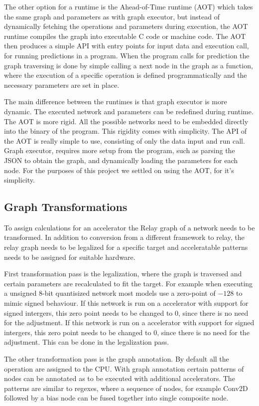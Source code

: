 \documentclass[12pt,a4paper,english
]{tunithesis}
\begin{document}
The other option for a runtime is the Ahead-of-Time runtime (AOT) which takes the same graph and parameters as with graph executor, but instead of dynamically fetching the operations and parameters during execution, the AOT runtime compiles the graph into executable C code or machine code. The AOT then produces a simple API with entry points for input data and execution call, for running predictions in a program. When the program calls for prediction the graph traversing is done by simple calling a next node in the graph as a function, where the execution of a specific operation is defined programmatically and the necessary parameters are set in place.

The main difference between the runtimes is that graph executor is more dynamic. The executed network and parameters can be redefined during runtime. The AOT is more rigid. All the possible networks need to be embedded directly into the binary of the program. This rigidity comes with simplicity. The API of the AOT is really simple to use, consisting of only the data input and run call. Graph executor, requires more setup from the program, such as parsing the JSON to obtain the graph, and dynamically loading the parameters for each node. For the purposes of this project we settled on using the AOT, for it's simplicity.

\subsection{Graph Transformations}
To assign calculations for an accelerator the Relay graph of a network needs to be transformed. In addition to conversion from a different framework to relay, the relay graph needs to be legalized for a specific target and acceleratable patterns needs to be assigned for suitable hardware.

First transformation pass is the legalization, where the graph is traversed and certain parameters are recalculated to fit the target. For example when executing a unsigned 8-bit quantisized network most models use a zero-point of $-128$ to mimic signed behaviour. If this network is run on a accelerator with support for signed intergers, this zero point needs to be changed to 0, since there is no need for the adjustment. If this network is run on a accelerator with support for signed intergers, this zero point needs to be changed to 0, since there is no need for the adjustment. This can be done in the legalization pass.

The other transformation pass is the graph annotation. By default all the operation are assigned to the CPU. With graph annotation certain patterns of nodes can be annotated as to be executed with additional accelerators. The patterns are similar to regexes, where a sequence of nodes, for example Conv2D followed by a bias node can be fused together into single composite node.
\end{document}
